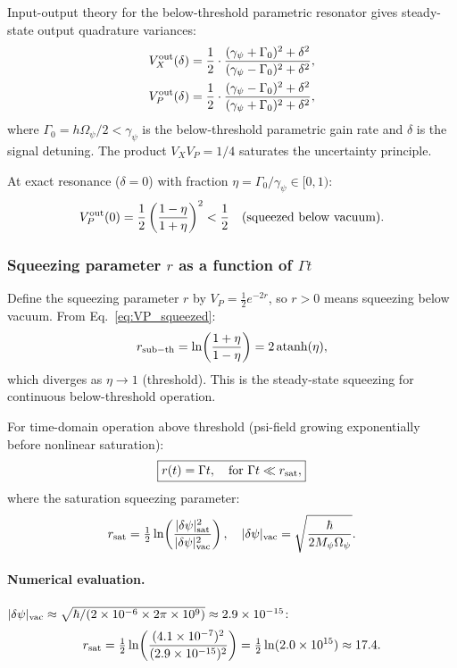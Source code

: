 \documentclass[11pt,twocolumn]{article}
\newcommand{\dpsi}{\delta\psi}
\newcommand{\Opsi}{\Omega_\psi}
\newcommand{\gpsi}{\gamma_\psi}
\newcommand{\Mpsi}{M_\psi}
\newcommand{\half}{\tfrac{1}{2}}
\begin{document}
Input-output theory for the below-threshold parametric resonator
gives steady-state output quadrature variances:
\begin{align}
V_X^{\rm out}(\delta) &= \frac{1}{2}
\cdot\frac{(\gpsi + \Gamma_0)^2 + \delta^2}
{(\gpsi - \Gamma_0)^2 + \delta^2},
\label{eq:VX_out}\\
V_P^{\rm out}(\delta) &= \frac{1}{2}
\cdot\frac{(\gpsi - \Gamma_0)^2 + \delta^2}
{(\gpsi + \Gamma_0)^2 + \delta^2},
\label{eq:VP_out}
\end{align}
where $\Gamma_0 = h\Opsi/2 < \gpsi$ is the below-threshold
parametric gain rate and $\delta$ is the signal detuning.
The product $V_X V_P = 1/4$ saturates the uncertainty principle.

At exact resonance ($\delta = 0$) with fraction $\eta = \Gamma_0/\gpsi
\in [0,1)$:
\begin{equation}
V_P^{\rm out}(0) = \frac{1}{2}\left(\frac{1-\eta}{1+\eta}\right)^2
< \frac{1}{2} \quad\text{(squeezed below vacuum)}.
\label{eq:VP_squeezed}
\end{equation}

\subsubsection{Squeezing parameter $r$ as a function of $\Gamma t$}
\label{sec:squeezing_r}

Define the squeezing parameter $r$ by $V_P = \half e^{-2r}$, so
$r > 0$ means squeezing below vacuum. From Eq.~\eqref{eq:VP_squeezed}:
\begin{equation}
r_{\rm sub-th} = \ln\!\left(\frac{1+\eta}{1-\eta}\right) = 2\,\text{atanh}(\eta),
\label{eq:r_sub}
\end{equation}
which diverges as $\eta \to 1$ (threshold). This is the steady-state
squeezing for continuous below-threshold operation.

For time-domain operation above threshold (psi-field growing
exponentially before nonlinear saturation):
\begin{equation}
\boxed{
r(t) = \Gamma t, \quad \text{for } \Gamma t \ll r_{\rm sat},
}
\label{eq:r_above}
\end{equation}
where the saturation squeezing parameter:
\begin{equation}
r_{\rm sat} = \half\ln\!\left(\frac{|\dpsi|_{\rm sat}^2}
{|\dpsi|_{\rm vac}^2}\right),
\quad
|\dpsi|_{\rm vac} = \sqrt{\frac{\hbar}{2\Mpsi\Opsi}}.
\label{eq:r_sat}
\end{equation}

\paragraph{Numerical evaluation.}
$|\dpsi|_{\rm vac} \approx \sqrt{\hbar/(2\times10^{-6}\times
2\pi\times10^9)} \approx 2.9\times10^{-15}$:
\begin{equation}
r_{\rm sat} = \half\ln\!\left(\frac{(4.1\times10^{-7})^2}
{(2.9\times10^{-15})^2}\right)
= \half\ln(2.0\times10^{15}) \approx 17.4.
\label{eq:r_sat_num}
\end{equation}
\end{document}
